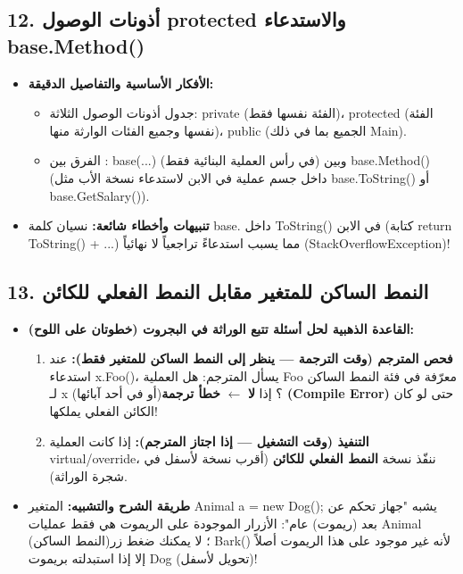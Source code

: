 \documentclass[14pt]{extarticle}
\begin{document}
\filbreak
\subsection*{12. أذونات الوصول \textenglish{protected} والاستدعاء \textenglish{base.Method()}}
\begin{itemize}[itemsep=0.3em]
    \item \textbf{الأفكار الأساسية والتفاصيل الدقيقة:}
    \begin{itemize}
        \item جدول أذونات الوصول الثلاثة: \textenglish{private} (الفئة نفسها فقط)، \textenglish{protected} (الفئة نفسها وجميع الفئات الوارثة منها)، \textenglish{public} (الجميع بما في ذلك \textenglish{Main}).
        \item الفرق بين \textenglish{: base(...)} (في رأس العملية البنائية فقط) وبين \textenglish{base.Method()} (داخل جسم عملية في الابن لاستدعاء نسخة الأب مثل \textenglish{base.ToString()} أو \textenglish{base.GetSalary()}).
    \end{itemize}
    \item \textbf{تنبيهات وأخطاء شائعة:} نسيان كلمة \textenglish{base.} داخل \textenglish{ToString()} في الابن (كتابة \textenglish{return ToString() + ...}) مما يسبب استدعاءً تراجعياً لا نهائياً (\textenglish{StackOverflowException})!
\end{itemize}

\filbreak
\subsection*{13. النمط الساكن للمتغير مقابل النمط الفعلي للكائن}
\begin{itemize}[itemsep=0.3em]
    \item \textbf{القاعدة الذهبية لحل أسئلة تتبع الوراثة في البجروت (خطوتان على اللوح):}
    \begin{enumerate}
        \item \textbf{فحص المترجم (وقت الترجمة — ينظر إلى النمط الساكن للمتغير فقط):} عند استدعاء \textenglish{x.Foo()}، يسأل المترجم: هل العملية \textenglish{Foo} معرّفة في فئة النمط الساكن لـ \textenglish{x} (أو في أحد آبائها)؟ إذا \textbf{لا} $\leftarrow$ \textbf{خطأ ترجمة (\textenglish{Compile Error})} حتى لو كان الكائن الفعلي يملكها!
        \item \textbf{التنفيذ (وقت التشغيل — إذا اجتاز المترجم):} إذا كانت العملية \textenglish{virtual/override}، ننفّذ نسخة \textbf{النمط الفعلي للكائن} (أقرب نسخة لأسفل في شجرة الوراثة).
    \end{enumerate}
    \item \textbf{طريقة الشرح والتشبيه:} المتغير \textenglish{Animal a = new Dog();} يشبه "جهاز تحكم عن بعد (ريموت) عام": الأزرار الموجودة على الريموت هي فقط عمليات \textenglish{Animal} (النمط الساكن)؛ لا يمكنك ضغط زر \textenglish{Bark()} لأنه غير موجود على هذا الريموت أصلاً إلا إذا استبدلته بريموت \textenglish{Dog} (تحويل لأسفل)!
\end{itemize}
\end{document}
